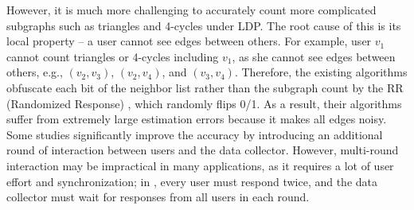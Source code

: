 However, it is much more challenging to accurately count more complicated subgraphs such as triangles and 4-cycles under LDP. 
The root cause of this is its local property -- a user cannot see edges between others. 
For example, user $v_1$ cannot count triangles or 4-cycles including $v_1$, as she cannot see edges between others, e.g., $(v_2,v_3)$, $(v_2,v_4)$, and $(v_3,v_4)$. 
Therefore, the existing algorithms \cite{Imola_USENIX21,Imola_USENIX22,Ye_ICDE20,Ye_TKDE21} 
obfuscate 
each bit of the neighbor list 
rather than the subgraph count by 
the RR (Randomized Response) \cite{Warner_JASA65}, which randomly flips 0/1. 
As a result, their algorithms suffer from extremely large estimation errors because it makes all edges noisy. 
Some studies \cite{Imola_USENIX21,Imola_USENIX22} 
significantly improve the accuracy by introducing 
an additional round of interaction between users and the data collector. 
However, multi-round interaction may be impractical in many applications, as it requires a lot of user effort and synchronization; 
in  \cite{Imola_USENIX21,Imola_USENIX22}, every user must respond twice, and the data collector must wait for responses from all users 
in each round. 

